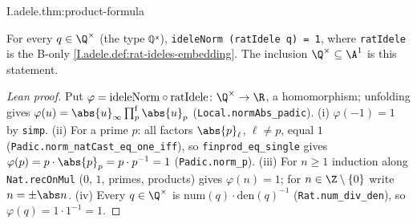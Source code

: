 \begin{theorem}
\end{theorem}
\begin{tfformal}{I.adele.thm:product-formula}
\begin{tffidelity}
For every $q\in\Q^\times$ (the type \texttt{ℚˣ}), \texttt{ideleNorm (ratIdele q) = 1}, where \texttt{ratIdele} is the B-only \cref{I.adele.def:rat-ideles-embedding}. The inclusion $\Q^\times\subseteq\A^1$ is this statement.
\end{tffidelity}
\end{tfformal}
\begin{proof}[Lean proof]
Put $\varphi=\mathrm{ideleNorm}\circ\mathrm{ratIdele}\colon\Q^\times\to\R$, a homomorphism; unfolding gives $\varphi(u)=\abs{u}_\infty\prod^{\mathrm f}_p\abs{u}_p$ (\texttt{Local.normAbs\_padic}). (i) $\varphi(-1)=1$ by \texttt{simp}. (ii) For a prime $p$: all factors $\abs{p}_\ell$, $\ell\ne p$, equal $1$ (\texttt{Padic.norm\_natCast\_eq\_one\_iff}), so \texttt{finprod\_eq\_single} gives $\varphi(p)=p\cdot\abs{p}_p=p\cdot p^{-1}=1$ (\texttt{Padic.norm\_p}). (iii) For $n\ge1$ induction along \texttt{Nat.recOnMul} ($0$, $1$, primes, products) gives $\varphi(n)=1$; for $n\in\Z\setminus\{0\}$ write $n=\pm\abs n$. (iv) Every $q\in\Q^\times$ is $\mathrm{num}(q)\cdot\mathrm{den}(q)^{-1}$ (\texttt{Rat.num\_div\_den}), so $\varphi(q)=1\cdot1^{-1}=1$.
\end{proof}

